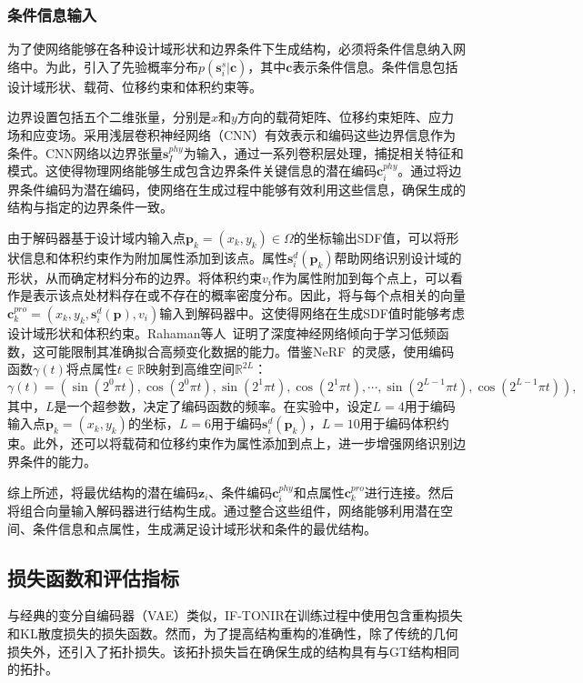 \subsubsection{条件信息输入}
为了使网络能够在各种设计域形状和边界条件下生成结构，必须将条件信息纳入网络中。为此，引入了先验概率分布$p(\mathbf{s}^s_i|\mathbf{c})$，其中$\mathbf{c}$表示条件信息。条件信息包括设计域形状、载荷、位移约束和体积约束等。

边界设置包括五个二维张量，分别是$x$和$y$方向的载荷矩阵、位移约束矩阵、应力场和应变场。采用浅层卷积神经网络（CNN）有效表示和编码这些边界信息作为条件。CNN网络以边界张量$\mathbf{s}_I^{phy}$为输入，通过一系列卷积层处理，捕捉相关特征和模式。这使得物理网络能够生成包含边界条件关键信息的潜在编码$\mathbf{c}^{phy}_i$。通过将边界条件编码为潜在编码，使网络在生成过程中能够有效利用这些信息，确保生成的结构与指定的边界条件一致。

由于解码器基于设计域内输入点$\mathbf{p}_k=(x_k,y_k)\in\Omega$的坐标输出SDF值，可以将形状信息和体积约束作为附加属性添加到该点。属性$\mathbf{s}^d_i(\mathbf{p}_k)$帮助网络识别设计域的形状，从而确定材料分布的边界。将体积约束$v_i$作为属性附加到每个点上，可以看作是表示该点处材料存在或不存在的概率密度分布。因此，将与每个点相关的向量$\mathbf{c}_k^{pro}=(x_k, y_k, \mathbf{s}^d_i(\mathbf{p}), v_i)$输入到解码器中。这使得网络在生成SDF值时能够考虑设计域形状和体积约束。Rahaman等人~\cite{rahaman2019}证明了深度神经网络倾向于学习低频函数，这可能限制其准确拟合高频变化数据的能力。借鉴NeRF~\cite{nerf2020}的灵感，使用编码函数$\gamma(t)$将点属性$t\in\mathbb{R}$映射到高维空间$\mathbb{R}^{2L}$：
\begin{equation}
    \gamma(t)=(\sin(2^0\pi t),\cos(2^0\pi t),\sin(2^1\pi t),\cos(2^1\pi t), \cdots, \sin(2^{L-1}\pi t),\cos(2^{L-1}\pi t)),
    \label{eq:pe}
\end{equation}
其中，$L$是一个超参数，决定了编码函数的频率。在实验中，设定$L=4$用于编码输入点$\mathbf{p}_k=(x_k,y_k)$的坐标，$L=6$用于编码$\mathbf{s}^d_i(\mathbf{p}_k)$，$L=10$用于编码体积约束。此外，还可以将载荷和位移约束作为属性添加到点上，进一步增强网络识别边界条件的能力。

综上所述，将最优结构的潜在编码$\mathbf{z}_i$、条件编码$\mathbf{c}^{phy}_i$和点属性$\mathbf{c}_k^{pro}$进行连接。然后将组合向量输入解码器进行结构生成。通过整合这些组件，网络能够利用潜在空间、条件信息和点属性，生成满足设计域形状和条件的最优结构。

\subsection{损失函数和评估指标}
与经典的变分自编码器（VAE）类似，IF-TONIR在训练过程中使用包含重构损失和KL散度损失的损失函数。然而，为了提高结构重构的准确性，除了传统的几何损失外，还引入了拓扑损失。该拓扑损失旨在确保生成的结构具有与GT结构相同的拓扑。

